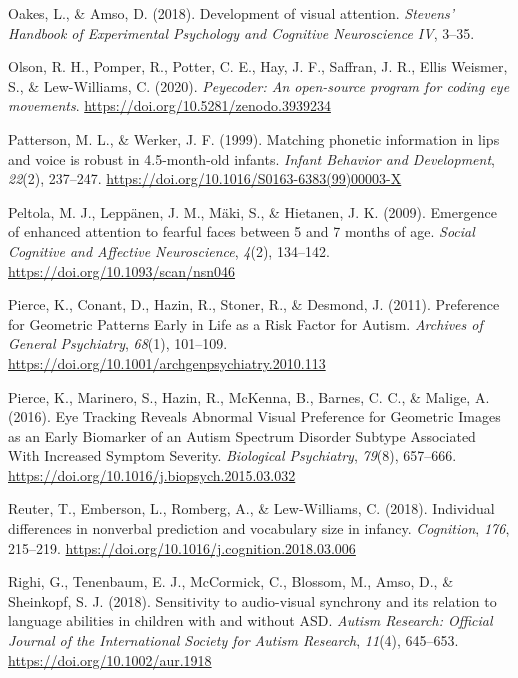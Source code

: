 \documentclass[
  english,
  man,floatsintext]{apa6}
\newlength{\cslhangindent}
\newenvironment{CSLReferences}[2] %
 {\begin{list}{}{%
  \setlength{\itemindent}{0pt}
  \setlength{\leftmargin}{0pt}
  \setlength{\parsep}{0pt}
  \ifodd #1
   \setlength{\leftmargin}{\cslhangindent}
   \setlength{\itemindent}{-1\cslhangindent}
  \fi
  \setlength{\itemsep}{#2\baselineskip}}}
 {\end{list}}
\begin{document}
\begin{CSLReferences}{1}{0}
Oakes, L., \& Amso, D. (2018). Development of visual attention. \emph{Stevens' Handbook of Experimental Psychology and Cognitive Neuroscience IV}, 3--35.

Olson, R. H., Pomper, R., Potter, C. E., Hay, J. F., Saffran, J. R., Ellis Weismer, S., \& Lew-Williams, C. (2020). \emph{Peyecoder: {An} open-source program for coding eye movements}. \url{https://doi.org/10.5281/zenodo.3939234}

Patterson, M. L., \& Werker, J. F. (1999). Matching phonetic information in lips and voice is robust in 4.5-month-old infants. \emph{Infant Behavior and Development}, \emph{22}(2), 237--247. \url{https://doi.org/10.1016/S0163-6383(99)00003-X}

Peltola, M. J., Leppänen, J. M., Mäki, S., \& Hietanen, J. K. (2009). Emergence of enhanced attention to fearful faces between 5 and 7 months of age. \emph{Social Cognitive and Affective Neuroscience}, \emph{4}(2), 134--142. \url{https://doi.org/10.1093/scan/nsn046}

Pierce, K., Conant, D., Hazin, R., Stoner, R., \& Desmond, J. (2011). Preference for {Geometric Patterns Early} in {Life} as a {Risk Factor} for {Autism}. \emph{Archives of General Psychiatry}, \emph{68}(1), 101--109. \url{https://doi.org/10.1001/archgenpsychiatry.2010.113}

Pierce, K., Marinero, S., Hazin, R., McKenna, B., Barnes, C. C., \& Malige, A. (2016). Eye {Tracking Reveals Abnormal Visual Preference} for {Geometric Images} as an {Early Biomarker} of an {Autism Spectrum Disorder Subtype Associated With Increased Symptom Severity}. \emph{Biological Psychiatry}, \emph{79}(8), 657--666. \url{https://doi.org/10.1016/j.biopsych.2015.03.032}

Reuter, T., Emberson, L., Romberg, A., \& Lew-Williams, C. (2018). Individual differences in nonverbal prediction and vocabulary size in infancy. \emph{Cognition}, \emph{176}, 215--219. \url{https://doi.org/10.1016/j.cognition.2018.03.006}

Righi, G., Tenenbaum, E. J., McCormick, C., Blossom, M., Amso, D., \& Sheinkopf, S. J. (2018). Sensitivity to audio-visual synchrony and its relation to language abilities in children with and without {ASD}. \emph{Autism Research: Official Journal of the International Society for Autism Research}, \emph{11}(4), 645--653. \url{https://doi.org/10.1002/aur.1918}


\end{CSLReferences}
\end{document}
